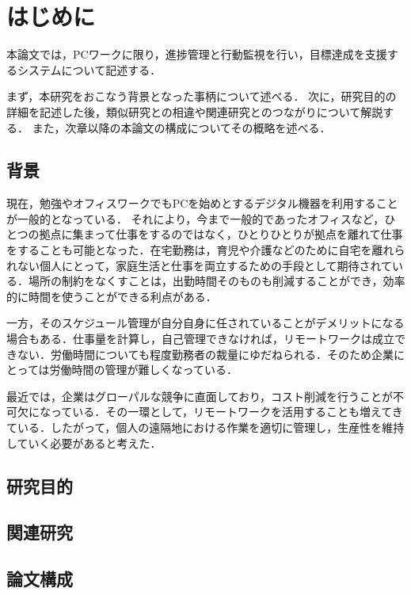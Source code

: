 \chapter{はじめに}
本論文では，PCワークに限り，進捗管理と行動監視を行い，目標達成を支援するシステムについて記述する．

まず，本研究をおこなう背景となった事柄について述べる．
次に，研究目的の詳細を記述した後，類似研究との相違や関連研究とのつながりについて解説する．
また，次章以降の本論文の構成についてその概略を述べる．

\section{背景}
現在，勉強やオフィスワークでもPCを始めとするデジタル機器を利用することが一般的となっている．
それにより，今まで一般的であったオフィスなど，ひとつの拠点に集まって仕事をするのではなく，ひとりひとりが拠点を離れて仕事をすることも可能となった．在宅勤務は，育児や介護などのために自宅を離れられない個人にとって，家庭生活と仕事を両立するための手段として期待されている．場所の制約をなくすことは，出勤時間そのものも削減することができ，効率的に時間を使うことができる利点がある．

一方，そのスケジュール管理が自分自身に任されていることがデメリットになる場合もある．仕事量を計算し，自己管理できなければ，リモートワークは成立できない．労働時間についても程度勤務者の裁量にゆだねられる．そのため企業にとっては労働時間の管理が難しくなっている．

最近では，企業はグローパルな競争に直面しており，コスト削減を行うことが不可欠になっている．その一環として，リモートワークを活用することも増えてきている．したがって，個人の遠隔地における作業を適切に管理し，生産性を維持していく必要があると考えた．

\section{研究目的}

\section{関連研究}

\section{論文構成}


